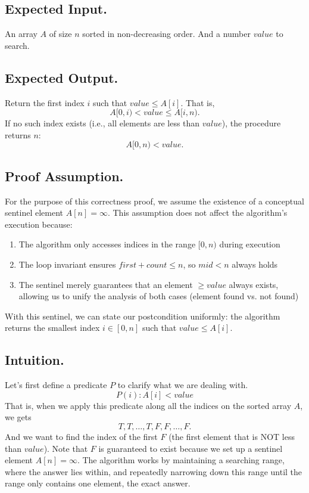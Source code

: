 \documentclass[12pt]{article}
\begin{document}
\subsection*{Expected Input.}

An array \(A\) of size \(n\) sorted in non-decreasing order. And a number \(value\) to search.

\subsection*{Expected Output.}

Return the first index \(i\) such that \(value \leq A[i]\). That is,
\[
    A[0, i) < value \leq A[i, n).
\]
If no such index exists (i.e., all elements are less than \(value\)), the procedure returns \(n\):
\[
    A[0, n) < value.
\]

\subsection*{Proof Assumption.}

For the purpose of this correctness proof, we assume the existence of a conceptual sentinel element \(A[n] = \infty\). This assumption does not affect the algorithm's execution because:
\begin{enumerate}
    \item The algorithm only accesses indices in the range \([0, n)\) during execution
    \item The loop invariant ensures \(first + count \leq n\), so \(mid < n\) always holds
    \item The sentinel merely guarantees that an element \(\geq value\) always exists, allowing us to unify the analysis of both cases (element found vs. not found)
\end{enumerate}

With this sentinel, we can state our postcondition uniformly: the algorithm returns the smallest index \(i \in [0, n]\) such that \(value \leq A[i]\).

\subsection*{Intuition.}

Let's first define a predicate \(P\) to clarify what we are dealing with.
\[
    P(i): A[i] < value
\]
That is, when we apply this predicate along all the indices on the sorted array \(A\), we gets
\[
    T, T, \dots, T, F, F, \dots, F.
\]
And we want to find the index of the first \(F\) (the first element that is NOT less than \(value\)). Note that \(F\) is guaranteed to exist because we set up a sentinel element \(A[n] = \infty\). The algorithm works by maintaining a searching range, where the answer lies within, and repeatedly narrowing down this range until the range only contains one element, the exact answer.
\end{document}
